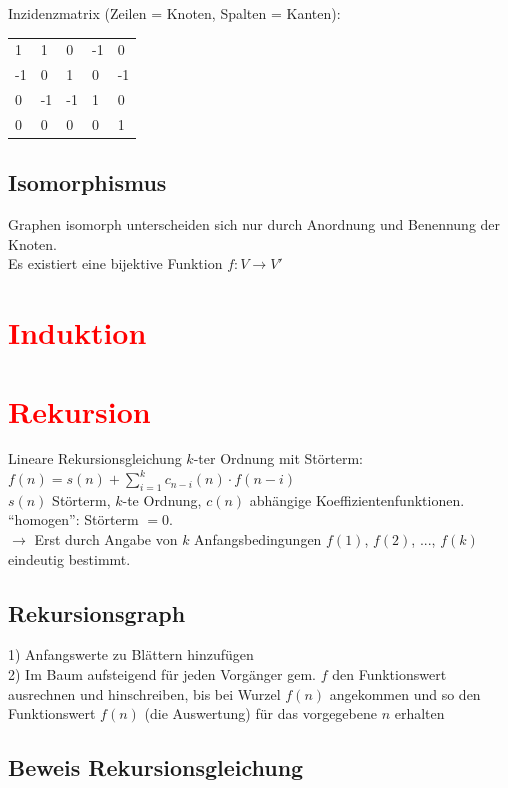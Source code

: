 \documentclass[8pt,landscape]{scrartcl}
\begin{document}
\begin{multicols}{3}
Inzidenzmatrix (Zeilen = Knoten, Spalten = Kanten):\\
\begin{tabular}{lllll}
1 & 1 & 0 & -1 & 0\\
-1 & 0 & 1 & 0 & -1\\
0 & -1 & -1 & 1 & 0\\
0 & 0 & 0 & 0 & 1
\end{tabular}

\subsection{Isomorphismus}
Graphen isomorph unterscheiden sich nur durch Anordnung und Benennung der Knoten.\\
Es existiert eine bijektive Funktion $f: V \rightarrow V'$


\section{\textcolor{red}{Induktion}}

\section{\textcolor{red}{Rekursion}}

Lineare Rekursionsgleichung $k$-ter Ordnung mit St\"orterm:\\
$f(n) = s(n) + \sum_{i=1}^k c_{n-i}(n) \cdot f(n-i)$\\
$s(n)$ St\"orterm, $k$-te Ordnung, $c(n)$ abh\"angige Koeffizientenfunktionen. ``homogen'': St\"orterm $= 0$.\\
$\rightarrow$ Erst durch Angabe von $k$ Anfangsbedingungen $f(1)$, $f(2)$, ..., $f(k)$ eindeutig bestimmt.

\subsection{Rekursionsgraph}
1) Anfangswerte zu Bl\"attern hinzuf\"ugen\\
2) Im Baum aufsteigend f\"ur jeden Vorg\"anger gem. $f$ den Funktionswert ausrechnen und hinschreiben, bis bei Wurzel $f(n)$ angekommen und so den Funktionswert $f(n)$ (die Auswertung) f\"ur das vorgegebene $n$ erhalten



\subsection{Beweis Rekursionsgleichung}


\end{multicols}
\end{document}
